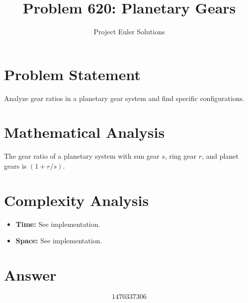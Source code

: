 \documentclass[11pt]{article}
\title{Problem 620: Planetary Gears}
\author{Project Euler Solutions}
\date{}
\begin{document}
\maketitle

\section{Problem Statement}
Analyze gear ratios in a planetary gear system and find specific configurations.

\section{Mathematical Analysis}
The gear ratio of a planetary system with sun gear $s$, ring gear $r$, and planet gears is $(1 + r/s)$.

\section{Complexity Analysis}
\begin{itemize}
    \item \textbf{Time:} See implementation.
    \item \textbf{Space:} See implementation.
\end{itemize}

\section{Answer}

\[
\boxed{1470337306}
\]
\end{document}
